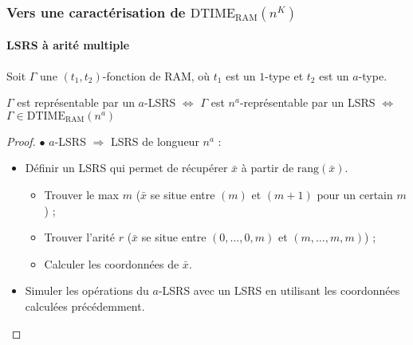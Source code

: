 \documentclass[10pt]{beamer}
\newcommand{\dtimeram}{\text{DTIME}_{\text{RAM}}\left( n^K \right)}
\newcommand{\dtimeramarg}[1]{\text{DTIME}_{\text{RAM}}\left( n^{#1} \right)}
\newcommand{\rang}[1]{\text{rang}\left( #1 \right)}
\begin{document}
	\begin{frame}
		\frametitle{Vers une caractérisation de $\dtimeram$}
		\framesubtitle{LSRS à arité multiple}
		
		\begin{thm}
			Soit $\Gamma$ une $(t_1,t_2)$-fonction de RAM, où $t_1$ est un $1$-type et $t_2$ est un $a$-type.
			
			$\Gamma$ est représentable par un $a$-LSRS $\Leftrightarrow$ $\Gamma$ est $n^a$-représentable par un LSRS $\Leftrightarrow$ $\Gamma \in \dtimeramarg{a}$
		\end{thm}
		
		\begin{proof}
				$\bullet$ $a$-LSRS $\Rightarrow$ LSRS de longueur $n^a$ :
			
				\begin{itemize}
					\item 	Définir un LSRS qui permet de récupérer $\bar{x}$ à partir de $\rang{\bar{x}}$.
					\pause 
					
					\begin{itemize}
						\item 	Trouver le max $m$ ($\bar{x}$ se situe entre $(m)$ et $(m+1)$ pour un certain $m$) ;
						\pause 
						\item 	Trouver l'arité $r$ ($\bar{x}$ se situe entre $(0, \dots, 0, m)$ et $(m, \dots, m, m)$) ;
						\pause 
						\item 	Calculer les coordonnées de $\bar{x}$.
					\end{itemize}
					\pause 
					\item	Simuler les opérations du $a$-LSRS avec un LSRS en utilisant les coordonnées calculées précédemment.
				\end{itemize}

		\end{proof}
	\end{frame}
	
\end{document}
